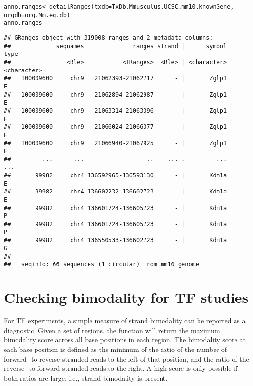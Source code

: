 \documentclass{report}\usepackage[]{graphicx}\usepackage[usenames,dvipsnames]{color}
\newcommand{\hlstd}[1]{\textcolor[rgb]{0.251,0.251,0.251}{#1}}%
\newcommand{\hlkwb}[1]{\textcolor[rgb]{0,0,0}{#1}}%
\newcommand{\hlkwc}[1]{\textcolor[rgb]{0.251,0.251,0.251}{#1}}%
\newcommand{\hlkwd}[1]{\textcolor[rgb]{0.878,0.439,0.125}{#1}}%
\newenvironment{knitrout}{}{} %
\begin{document}
\begin{knitrout}
\color{fgcolor}\begin{kframe}
\begin{alltt}
\hlstd{anno.ranges} \hlkwb{<-} \hlkwd{detailRanges}\hlstd{(}\hlkwc{txdb}\hlstd{=TxDb.Mmusculus.UCSC.mm10.knownGene,}
                            \hlkwc{orgdb}\hlstd{=org.Mm.eg.db)}
\hlstd{anno.ranges}
\end{alltt}
\begin{verbatim}
## GRanges object with 319008 ranges and 2 metadata columns:
##             seqnames              ranges strand |      symbol        type
##                <Rle>           <IRanges>  <Rle> | <character> <character>
##   100009600     chr9   21062393-21062717      - |       Zglp1           E
##   100009600     chr9   21062894-21062987      - |       Zglp1           E
##   100009600     chr9   21063314-21063396      - |       Zglp1           E
##   100009600     chr9   21066024-21066377      - |       Zglp1           E
##   100009600     chr9   21066940-21067925      - |       Zglp1           E
##         ...      ...                 ...    ... .         ...         ...
##       99982     chr4 136592965-136593130      - |       Kdm1a           E
##       99982     chr4 136602232-136602723      - |       Kdm1a           E
##       99982     chr4 136601724-136605723      - |       Kdm1a           P
##       99982     chr4 136601724-136605723      - |       Kdm1a           P
##       99982     chr4 136550533-136602723      - |       Kdm1a           G
##   -------
##   seqinfo: 66 sequences (1 circular) from mm10 genome
\end{verbatim}
\end{kframe}
\end{knitrout}

\section{Checking bimodality for TF studies}
For TF experiments, a simple measure of strand bimodality can be reported as a diagnostic.
Given a set of regions, the  function will return the maximum bimodality score across all base positions in each region.
The bimodality score at each base position is defined as the minimum of the ratio of the number of forward- to reverse-stranded reads to the left of that position, and the ratio of the reverse- to forward-stranded reads to the right.
A high score is only possible if both ratios are large, i.e., strand bimodality is present.
\end{document}
